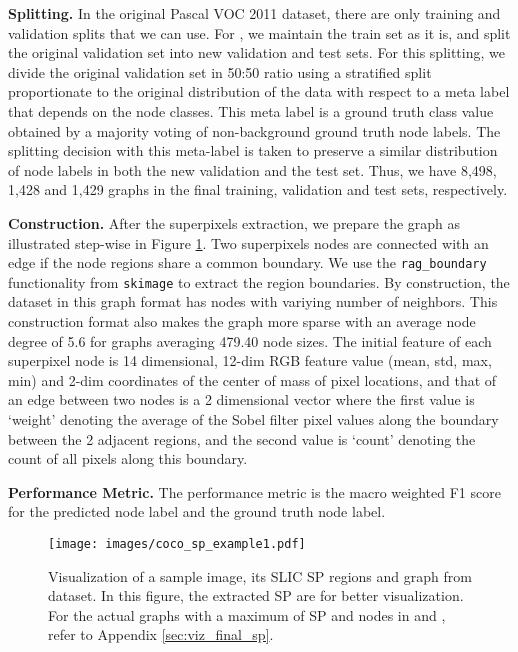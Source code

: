\documentclass{article}
\begin{document}
\textbf{Splitting.} In the original Pascal VOC 2011 dataset, there are only training and validation splits that we can use. For \pascal, we maintain the train set as it is, and split the original validation set into new validation and test sets. For this splitting, we divide the original validation set in 50:50 ratio using a stratified split proportionate to the original distribution of the data with respect to a meta label that depends on the node classes. This meta label is a ground truth class value obtained by a majority voting of non-background ground truth node labels. The splitting decision with this meta-label is taken to preserve a similar distribution of node labels in both the new validation and the test set. Thus, we have 8,498, 1,428 and 1,429 graphs in the final training, validation and test sets, respectively.






\textbf{Construction.}
After the superpixels extraction, we prepare the \rbgraph graph as illustrated step-wise in Figure \ref{fig:fig_viz_sp}.
Two superpixels nodes are connected with an edge if the node regions share a common boundary. We use the \texttt{rag\_boundary} functionality from \texttt{skimage} \cite{boulogne2014scikit} to extract the region boundaries. By construction, the dataset in this \rbgraph graph format has nodes with variying number of neighbors. This construction format also makes the graph more sparse with an average node degree of 5.6 for graphs averaging 479.40 node sizes. The initial feature of each superpixel node is 14 dimensional, 12-dim RGB feature value (mean, std, max, min) and 2-dim coordinates of the center of mass of pixel locations, and that of an edge between two nodes is a 2 dimensional vector where the first value is `weight' denoting the average of the Sobel filter \cite{engel2004real} pixel values along the boundary between the 2 adjacent regions, and the second value is `count' denoting the count of all pixels along this boundary.

\textbf{Performance Metric.} The performance metric is the macro weighted F1 score for the predicted node label and the ground truth node label.





\begin{figure}[t]
    \centering
\texttt{[image: images/coco\_sp\_example1.pdf]}
\caption{Visualization of a sample image, its SLIC SP regions and \rbgraph graph from \coco dataset. In this figure, the extracted SP are  for better visualization. For the actual graphs with a maximum of  SP and nodes in \pascal and \coco, refer to Appendix \ref{sec:viz_final_sp}.}
\label{fig:fig_viz_sp}
\vspace{-8pt}
\end{figure}
\end{document}
